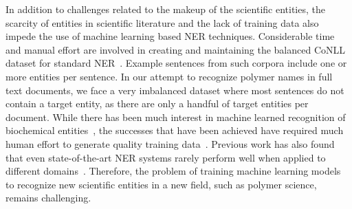 
In addition to challenges related to the makeup of the scientific entities, the scarcity of entities in scientific literature and the lack of training data also impede the use of machine learning based NER techniques.
Considerable time and manual effort are involved in creating and maintaining the balanced
CoNLL dataset for standard NER~\cite{tjong2003introduction}.
Example sentences from such corpora include one or more entities per sentence. 
In our attempt to recognize polymer names in full text documents, we face a very imbalanced dataset where most sentences do not contain a target entity, as there are only a handful of target entities per document.
While there has been much interest in machine learned recognition of biochemical entities~\cite{jessop2011oscar4,rocktaschel2012chemspot,leaman2015tmchem,swain2016chemdataextractor}, 
the successes that have been achieved have required much human effort to generate quality training data~\cite{krallinger2015chemdner}.
Previous work has also found that even state-of-the-art NER systems rarely
 perform well when applied to different domains~\cite{krallinger2013overview}. 
Therefore, the problem of training machine learning models to recognize new scientific entities in a new field, such as polymer science, remains challenging.



